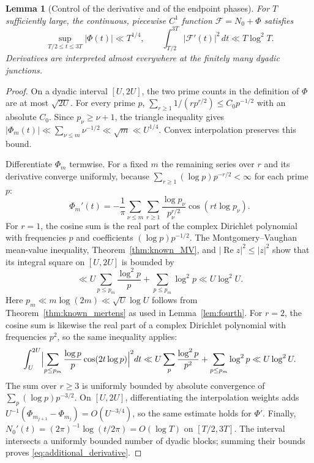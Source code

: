 \documentclass[11pt,a4paper]{article}
\makeatletter
\numberwithin{equation}{section}
\DeclareRobustCommand{\CGref}[1]{\ref{#1}}
\DeclareRobustCommand{\CGeqref}[1]{\eqref{#1}}
\let\CG@origref\ref
\let\CG@origeqref\eqref
\newcommand{\CG@gettip}[1]{\@ifundefined{CGTip@#1}{#1}{\csname CGTip@#1\endcsname}}
\DeclareRobustCommand{\CGref}[1]{\pdftooltip{\CG@origref{#1}}{\CG@gettip{#1}}}
\DeclareRobustCommand{\CGeqref}[1]{\pdftooltip{\CG@origeqref{#1}}{\CG@gettip{#1}}}
\newtheorem{lemma}[theorem]{Lemma}
\theoremstyle{definition}
\theoremstyle{remark}
\newcommand{\Nz}{N_0} %
\newcommand{\Fc}{\mathcal F}
\newcommand{\Ph}{\Phi}
\makeatother
\begin{document}
\begin{lemma}[Control of the derivative and of the endpoint phases]\label{lem:additional_derivative}
For $T$ sufficiently large, the continuous, piecewise $C^1$ function $\Fc=\Nz+\Ph$ satisfies
\begin{equation}
\sup_{T/2\le t\le3T}|\Ph(t)|\ll T^{1/4},
\qquad
\int_{T/2}^{3T}|\Fc'(t)|^2\,dt\ll T\log^2T.
\label{eq:additional_derivative}
\end{equation}
Derivatives are interpreted almost everywhere at the finitely many dyadic junctions.
\end{lemma}
\begin{proof}
On a dyadic interval $[U,2U]$, the two prime counts in the definition of
$\Ph$ are at most $\sqrt{2U}$. For every prime $p$,
$\sum_{r\ge1}1/(rp^{r/2})\le C_0p^{-1/2}$ with an absolute $C_0$.
Since $p_\nu\ge\nu+1$, the triangle inequality gives
$|\Ph_m(t)|\ll\sum_{\nu\le m}\nu^{-1/2}\ll\sqrt m\ll U^{1/4}$.
Convex interpolation preserves this bound.

Differentiate $\Ph_m$ termwise. For a fixed $m$ the remaining series over $r$ and its derivative converge uniformly, because $\sum_{r\ge1}(\log p)p^{-r/2}<\infty$ for each prime $p$:
\[
\Ph_m'(t)=-\frac1\pi\sum_{\nu\le m}\sum_{r\ge1}
\frac{\log p_\nu}{p_\nu^{r/2}}\cos(rt\log p_\nu).
\]
For $r=1$, the cosine sum is the real part of the complex Dirichlet polynomial with frequencies $p$ and coefficients $(\log p)p^{-1/2}$.
The Montgomery--Vaughan mean-value inequality, Theorem~\CGref{thm:known_MV}, and $|\operatorname{Re}z|^2\le|z|^2$ show that its integral square on
$[U,2U]$ is bounded by
\[
\ll U\sum_{p\le p_m}\frac{\log^2p}{p}
 +\sum_{p\le p_m}\log^2p
\ll U\log^2U.
\]
Here $p_m\ll m\log(2m)\ll\sqrt U\log U$ follows from
Theorem~\CGref{thm:known_mertens} as used in Lemma~\CGref{lem:fourth}.
For $r=2$, the cosine sum is likewise the real part of a complex Dirichlet polynomial with frequencies $p^2$, so the same inequality applies:
\[
\int_U^{2U}\Bigl|\sum_{p\le p_m}
\frac{\log p}{p}\cos(2t\log p)\Bigr|^2dt
\ll U\sum_p\frac{\log^2p}{p^2}
+\sum_{p\le p_m}\log^2p
\ll U\log^2U.
\]
The sum over $r\ge3$ is uniformly bounded by absolute convergence of
$\sum_p(\log p)p^{-3/2}$.
On $[U,2U]$, differentiating the interpolation weights adds
$U^{-1}(\Ph_{m_{j+1}}-\Ph_{m_j})=O(U^{-3/4})$, so the same estimate holds
for $\Ph'$.
Finally, $\Nz'(t)=(2\pi)^{-1}\log(t/2\pi)=O(\log T)$ on
$[T/2,3T]$. The interval intersects a uniformly bounded number of dyadic blocks;
summing their bounds proves \CGeqref{eq:additional_derivative}.
\end{proof}
\end{document}
